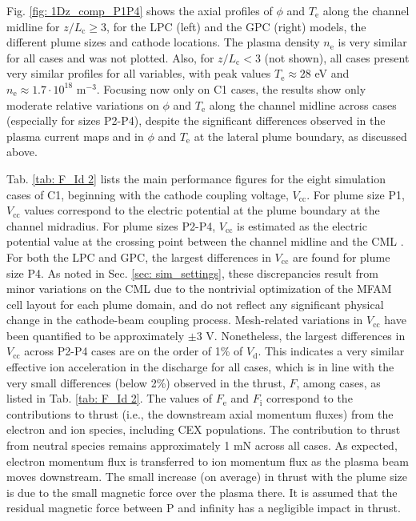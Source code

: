 \documentclass[%
 aip,
cha,
 amsmath,amssymb,
 reprint,%
]{revtex4-1}
\begin{document}
Fig. \ref{fig: 1Dz_comp_P1P4} shows the axial profiles of $\phi$ and $T_\mathrm{e}$ along the channel midline for $z/L_\mathrm{c} \geq 3$, for the LPC (left) and the GPC (right) models, the different plume sizes and cathode locations. The plasma density $n_\mathrm{e}$ is very similar for all cases and was not plotted. Also, for $z/L_\mathrm{c} < 3$ (not shown), all cases present very similar profiles for all variables, with peak values $T_\mathrm{e} \approx 28$ eV and $n_\mathrm{e} \approx 1.7\cdot 10^{18}$ m$^{-3}$. 
Focusing now only on C1 cases, the results show only moderate relative variations on $\phi$ and $T_\mathrm{e}$ along the channel midline across cases (especially for sizes P2-P4), despite the significant differences observed in the plasma current maps and in $\phi$ and $T_\mathrm{e}$ at the lateral plume boundary, as discussed above. 



Tab. \ref{tab: F_Id 2} lists the main performance figures for the eight simulation cases of C1, beginning with the cathode coupling voltage, $V_\mathrm{cc}$.
For plume size P1, $V_\mathrm{cc}$ values correspond to the electric potential at the plume boundary at the channel midradius.
For plume sizes P2-P4, $V_\mathrm{cc}$ is estimated as the electric potential value at the crossing point between the channel midline and the CML \cite{jorn21}.
For both the LPC and GPC, the largest differences in $V_\mathrm{cc}$ are found for plume size P4.
%
As noted in Sec. \ref{sec: sim_settings}, these discrepancies result from minor variations on the CML due to the nontrivial optimization of the MFAM cell layout for each plume domain, and do not reflect any significant physical change in the cathode-beam coupling process.
Mesh-related variations in $V_\mathrm{cc}$ have been quantified to be approximately $\pm 3$ V.
%
Nonetheless, the largest differences in $V_\mathrm{cc}$ across P2-P4 cases are on the order of 1\% of $V_\mathrm{d}$.
This indicates a very similar effective ion acceleration in the discharge for all cases,
%
which is in line with the very small differences (below 2\%) observed in the thrust, $F$, among cases, as listed in Tab. \ref{tab: F_Id 2}. The values of $F_\mathrm{e}$ and $F_\mathrm{i}$ correspond to the contributions to thrust (i.e., the downstream axial momentum fluxes) from the electron and ion species, including CEX populations.  The contribution to thrust from neutral species remains approximately 1 mN across all cases. As expected, electron momentum flux is transferred to ion momentum flux as the plasma beam moves downstream. The small increase (on average) in thrust with the plume size is due to the small magnetic force over the plasma there. It is assumed that the residual magnetic force between P and infinity has a negligible impact in thrust. 
\end{document}
